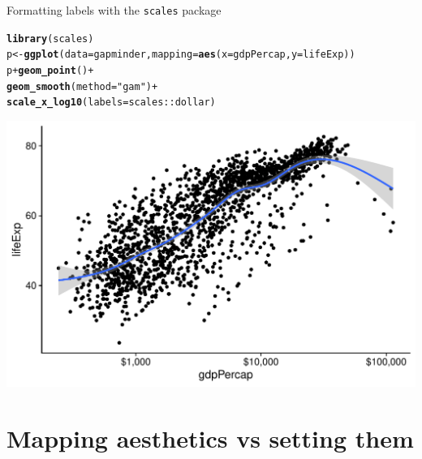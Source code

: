 \documentclass[10pt]{beamer}\usepackage[]{graphicx}\usepackage[]{color}
\makeatletter
\def\maxwidth{ %
  \ifdim\Gin@nat@width>\linewidth
    \linewidth
  \else
    \Gin@nat@width
  \fi
}
\newcommand{\hlstr}[1]{\textcolor[rgb]{0.192,0.494,0.8}{#1}}%
\newcommand{\hlopt}[1]{\textcolor[rgb]{0,0,0}{#1}}%
\newcommand{\hlstd}[1]{\textcolor[rgb]{0.345,0.345,0.345}{#1}}%
\newcommand{\hlkwb}[1]{\textcolor[rgb]{0.69,0.353,0.396}{#1}}%
\newcommand{\hlkwc}[1]{\textcolor[rgb]{0.333,0.667,0.333}{#1}}%
\newcommand{\hlkwd}[1]{\textcolor[rgb]{0.737,0.353,0.396}{\textbf{#1}}}%
\newenvironment{kframe}{%
 \def\at@end@of@kframe{}%
 \ifinner\ifhmode%
  \def\at@end@of@kframe{\end{minipage}}%
  \begin{minipage}{\columnwidth}%
 \fi\fi%
 \def\FrameCommand##1{\hskip\@totalleftmargin \hskip-\fboxsep
 \colorbox{shadecolor}{##1}\hskip-\fboxsep
     \hskip-\linewidth \hskip-\@totalleftmargin \hskip\columnwidth}%
 \MakeFramed {\advance\hsize-\width
   \@totalleftmargin\z@ \linewidth\hsize
   \@setminipage}}%
 {\par\unskip\endMakeFramed%
 \at@end@of@kframe}
\newenvironment{knitrout}{}{} %
\makeatother
\begin{document}
\begin{frame}[fragile]{Formatting labels with the \texttt{scales} package}
\begin{knitrout}\tiny
{}\color{fgcolor}\begin{kframe}
\begin{alltt}
\hlkwd{library}\hlstd{(scales)}
\hlstd{p} \hlkwb{<-} \hlkwd{ggplot}\hlstd{(}\hlkwc{data} \hlstd{= gapminder,} \hlkwc{mapping} \hlstd{=} \hlkwd{aes}\hlstd{(}\hlkwc{x} \hlstd{= gdpPercap,} \hlkwc{y}\hlstd{=lifeExp))}
\hlstd{p} \hlopt{+} \hlkwd{geom_point}\hlstd{()} \hlopt{+}
        \hlkwd{geom_smooth}\hlstd{(}\hlkwc{method} \hlstd{=} \hlstr{"gam"}\hlstd{)} \hlopt{+}
        \hlkwd{scale_x_log10}\hlstd{(}\hlkwc{labels} \hlstd{= scales}\hlopt{::}\hlstd{dollar)}
\end{alltt}
\end{kframe}

{\centering \includegraphics[width=\maxwidth]{figure/unnamed-chunk-10-1} 

}


\end{knitrout}

\end{frame}



\section{Mapping aesthetics vs setting them}
\end{document}
